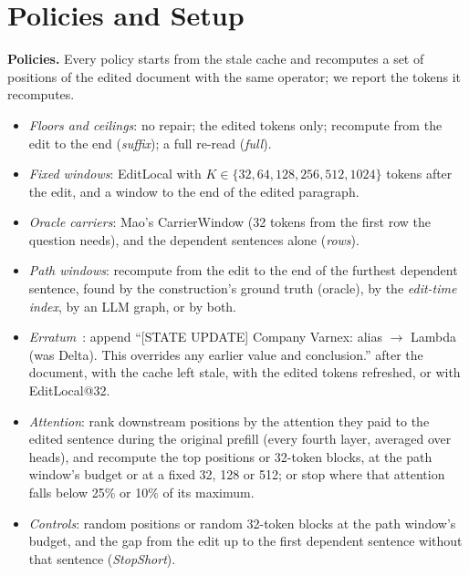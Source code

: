 \documentclass[conference]{IEEEtran}
\begin{document}
\section{Policies and Setup}

\textbf{Policies.} Every policy starts from the stale cache and recomputes a set of positions of the edited
document with the same operator; we report the tokens it recomputes.
\begin{itemize}
\item \emph{Floors and ceilings}: no repair; the edited tokens only; recompute from the edit to the end
(\emph{suffix}); a full re-read (\emph{full}).
\item \emph{Fixed windows}: EditLocal with $K \in \{32, 64, 128, 256, 512, 1024\}$ tokens after the edit, and a
window to the end of the edited paragraph.
\item \emph{Oracle carriers}: Mao's CarrierWindow (32 tokens from the first row the question needs), and the
dependent sentences alone (\emph{rows}).
\item \emph{Path windows}: recompute from the edit to the end of the furthest dependent sentence, found by the
construction's ground truth (oracle), by the \emph{edit-time index}, by an LLM graph, or by both.
\item \emph{Erratum}~\cite{li2026programmable}: append ``[STATE UPDATE] Company Varnex: alias $\rightarrow$
Lambda (was Delta). This overrides any earlier value and conclusion.'' after the document, with the cache left
stale, with the edited tokens refreshed, or with EditLocal@32.
\item \emph{Attention}: rank downstream positions by the attention they paid to the edited sentence during the
original prefill (every fourth layer, averaged over heads), and recompute the top positions or 32-token
blocks, at the path window's budget or at a fixed 32, 128 or 512; or stop where that attention falls below 25\%
or 10\% of its maximum.
\item \emph{Controls}: random positions or random 32-token blocks at the path window's budget, and the gap from
the edit up to the first dependent sentence without that sentence (\emph{StopShort}).
\end{itemize}
\end{document}
